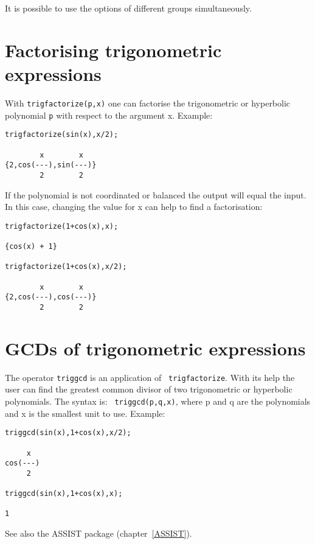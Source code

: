 It is possible to use the options of different groups simultaneously.



\section{Factorising trigonometric expressions}

With {\tt trigfactorize(p,x)} one can factorise the trigonometric or 
hyperbolic polynomial {\tt p} with respect to the argument x. Example:

\begin{verbatim}
trigfactorize(sin(x),x/2); 

        x        x
{2,cos(---),sin(---)}
        2        2
\end{verbatim}

If the polynomial is not coordinated or balanced the output will equal
the input.  In this case, changing the value for x can help to find a
factorisation: 

\begin{verbatim}
trigfactorize(1+cos(x),x);

{cos(x) + 1}

trigfactorize(1+cos(x),x/2); 

        x        x
{2,cos(---),cos(---)}
        2        2
\end{verbatim}


\section{GCDs of trigonometric expressions}

The operator {\tt triggcd} is an application of {\tt
trigfactorize}.  With its help the user can find the greatest common
divisor of two trigonometric or hyperbolic polynomials. The syntax is: {\tt
triggcd(p,q,x)}, where p and q  are the polynomials and x is the
smallest unit to use. Example:

\begin{verbatim}
triggcd(sin(x),1+cos(x),x/2);

     x
cos(---)
     2 

triggcd(sin(x),1+cos(x),x);

1
\end{verbatim}

See also the ASSIST package (chapter~\ref{ASSIST}).

